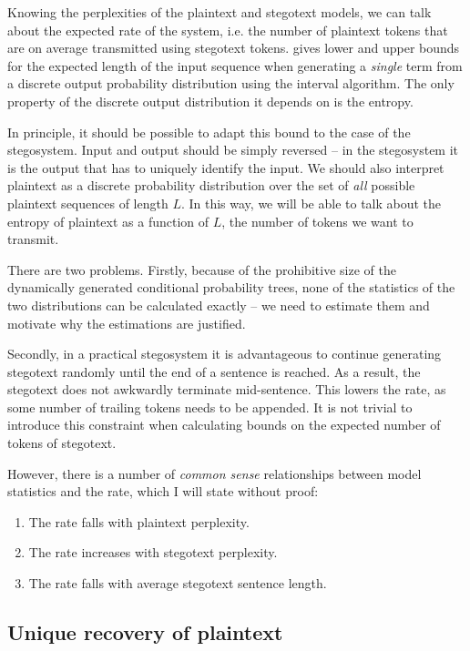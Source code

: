 \documentclass[draft]{IIBproject}
\makeatletter
\DeclareRobustCommand*{\ie}{i.e.\@\xspace}
\makeatother
\begin{document}
Knowing the perplexities of the plaintext and stegotext models, we can talk about the expected rate of the system, \ie the number of plaintext tokens that are on average transmitted using stegotext tokens. \cite{hanhoshi1997} gives lower and upper bounds for the expected length of the input sequence when generating a \emph{single} term from a discrete output probability distribution using the interval algorithm. The only property of the discrete output distribution it depends on is the entropy.

In principle, it should be possible to adapt this bound to the case of the stegosystem. Input and output should be simply reversed -- in the stegosystem it is the output that has to uniquely identify the input. We should also interpret plaintext as a discrete probability distribution over the set of \emph{all} possible plaintext sequences of length $L$. In this way, we will be able to talk about the entropy of plaintext as a function of $L$, the number of tokens we want to transmit.

There are two problems. Firstly, because of the prohibitive size of the dynamically generated conditional probability trees, none of the statistics of the two distributions can be calculated exactly -- we need to estimate them and motivate why the estimations are justified.

Secondly, in a practical stegosystem it is advantageous to continue generating stegotext randomly until the end of a sentence is reached. As a result, the stegotext does not awkwardly terminate mid-sentence. This lowers the rate, as some number of trailing tokens needs to be appended. It is not trivial to introduce this constraint when calculating bounds on the expected number of tokens of stegotext.

However, there is a number of \emph{common sense} relationships between model statistics and the rate, which I will state without proof:

\begin{enumerate}
\item The rate falls with plaintext perplexity.
\item The rate increases with stegotext perplexity.
\item The rate falls with average stegotext sentence length.
\end{enumerate}

\subsection{Unique recovery of plaintext}
\end{document}
